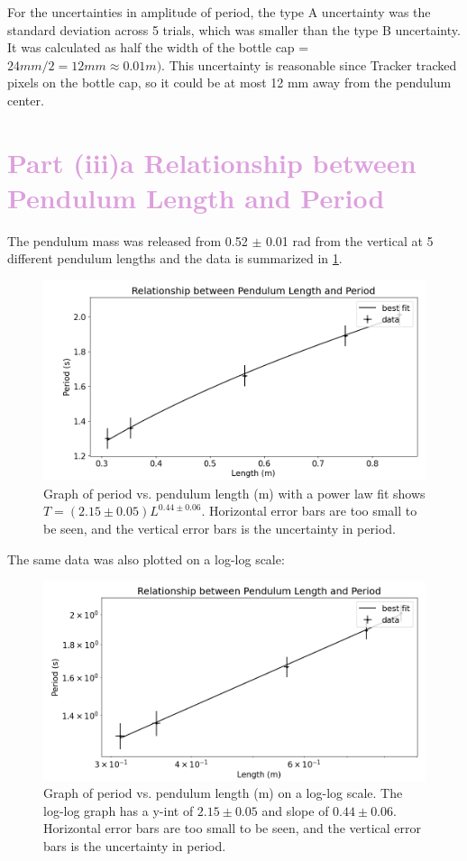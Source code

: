 \documentclass[notitlepage, twocolumn, 12pt]{article}
\begin{document}
    For the uncertainties in amplitude of period, the type A uncertainty was the standard deviation across 5 trials, which was smaller than the type B uncertainty. It was calculated as half the width of the bottle cap = $24 mm / 2 = 12 mm \approx 0.01 m)$. This uncertainty is reasonable since Tracker tracked pixels on the bottle cap, so it could be at most 12 mm away from the pendulum center. 
    
    \section*{\textcolor{Plum}{Part (iii)a Relationship between Pendulum Length and Period}}
    \color{Plum}
    The pendulum mass was released from 0.52 $\pm$ 0.01 rad from the vertical at 5 different pendulum lengths and the data is summarized in \cref{fig:pendulumLengthVsPeriod}.
    \begin{figure}[H]
        \includegraphics[width=\linewidth]{lengthvsperiodreal.png}
        \caption{\color{Plum} Graph of period vs. pendulum length (m) with a power law fit shows $T = (2.15 \pm 0.05)L^{0.44 \pm 0.06}$. Horizontal error bars are too small to be seen, and the vertical error bars is the uncertainty in period. }
        \label{fig:pendulumLengthVsPeriod}
    \end{figure} 
    The same data was also plotted on a log-log scale:
    \begin{figure}[H]
        \includegraphics[width=\linewidth]{loglong-lengthvsperiodv2.png}
        \caption{\color{Plum} Graph of period vs. pendulum length (m) on a log-log scale. The log-log graph has a y-int of $2.15 \pm 0.05$ and slope of $0.44 \pm 0.06$. Horizontal error bars are too small to be seen, and the vertical error bars is the uncertainty in period. }
        \label{fig:loglog-pendulumLengthVsPeriod}
    \end{figure} 
\end{document}
